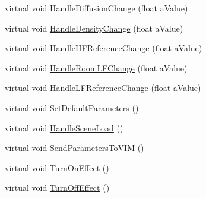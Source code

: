 \begin{DoxyCompactItemize}
\item 
virtual void \hyperlink{class_a_t_i_1_1_audio_effect_handler_adcf777de620420b6c411350db0eca2aa}{Handle\+Diffusion\+Change} (float a\+Value)
\item 
virtual void \hyperlink{class_a_t_i_1_1_audio_effect_handler_acdbfbd384e2fdb5bd43ad977e264500a}{Handle\+Density\+Change} (float a\+Value)
\item 
virtual void \hyperlink{class_a_t_i_1_1_audio_effect_handler_a183b75c93279e0d6322a0e005c590891}{Handle\+H\+F\+Reference\+Change} (float a\+Value)
\item 
virtual void \hyperlink{class_a_t_i_1_1_audio_effect_handler_ae2648d4ab8a617cbc509f7cfc38f21f6}{Handle\+Room\+L\+F\+Change} (float a\+Value)
\item 
virtual void \hyperlink{class_a_t_i_1_1_audio_effect_handler_a8414b47429880ba18133571c86cf14ab}{Handle\+L\+F\+Reference\+Change} (float a\+Value)
\item 
virtual void \hyperlink{class_a_t_i_1_1_audio_effect_handler_a9f2b5ce4ce7b2e3a7cca147a87733a77}{Set\+Default\+Parameters} ()
\item 
virtual void \hyperlink{class_a_t_i_1_1_audio_effect_handler_aa038c62089df16a01d2749986649db11}{Handle\+Scene\+Load} ()
\item 
virtual void \hyperlink{class_a_t_i_1_1_audio_effect_handler_aab43cfccb835b9630456eb4590626e6d}{Send\+Parameters\+To\+V\+IM} ()
\item 
virtual void \hyperlink{class_a_t_i_1_1_audio_effect_handler_abccfc2e809d0d6b643704f7391461cd7}{Turn\+On\+Effect} ()
\item 
virtual void \hyperlink{class_a_t_i_1_1_audio_effect_handler_aed35f816dce2a75b857c79ffbb6cc677}{Turn\+Off\+Effect} ()
\end{DoxyCompactItemize}
